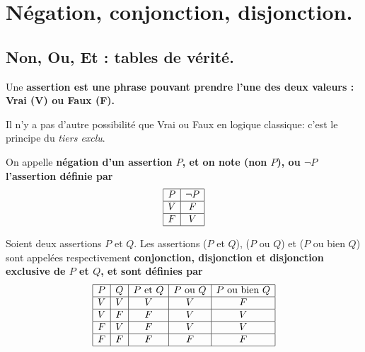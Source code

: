 \documentclass[11pt]{article}
\begin{document}


\thispagestyle{fancy}

\section{Négation, conjonction, disjonction.}

\subsection{Non, Ou, Et : tables de vérité.}

\begin{defi}{}{}
    Une \bf{assertion} est une phrase pouvant prendre l'une des deux valeurs : Vrai (V) ou Faux (F).
\end{defi}

Il n'y a pas d'autre possibilité que Vrai ou Faux en logique classique: c'est le principe du \emph{tiers exclu}.
\vspace*{0.3cm}

\begin{defi}{}{}
    On appelle \bf{négation} d'un assertion $P$, et on note (non $P$), ou $\lnot P$ l'assertion définie par
    \begin{equation*}
        \begin{array}{|c|c|}
            \hline
            P&\lnot P\\
            \hline
            V&F\\
            \hline
            F&V\\
            \hline
        \end{array}
    \end{equation*}
\end{defi}

\begin{defi}{}{}
    Soient deux assertions $P$ et $Q$. Les assertions ($P$ et $Q$), ($P$ ou $Q$) et ($P$ ou bien $Q$) sont appelées respectivement \bf{conjonction}, \bf{disjonction} et disjonction exclusive de $P$ et $Q$, et sont définies par
    \begin{equation*}
        \begin{array}{|c|c|c|c|c|}
            \hline
            P&Q&P$ et $Q&P$ ou $Q&P$ ou bien $Q\\
            \hline
            V&V&V&V&F\\
            \hline
            V&F&F&V&V\\
            \hline
            F&V&F&V&V\\
            \hline
            F&F&F&F&F\\
            \hline
        \end{array}
    \end{equation*}
\end{defi}
\end{document}
